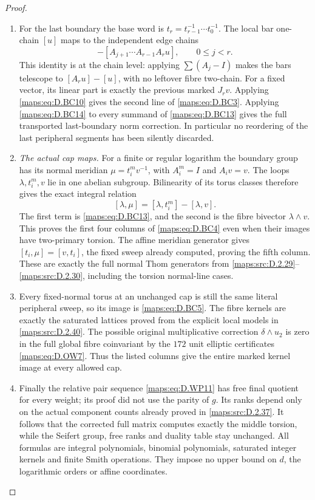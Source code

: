 \begin{proof}
\begin{enumerate}[label=\arabic*.,leftmargin=*]
\item For the last boundary the base word is
$t_r=t_{r-1}^{-1}\cdots t_0^{-1}$.
The local bar one-chain $[u]$ maps to the
independent edge chains
\[
         -[A_{j+1}\cdots A_{r-1}A_ru],
                            \qquad 0\le j<r .
                                                        \tag{D.BC14}\label{maps:eq:D.BC14}
\]
This identity is at the chain level: applying
$\sum(A_j-I)$ makes the bars telescope to
$[A_ru]-[u]$, with no leftover fibre two-chain.
For a fixed vector, its linear part is exactly
the previous marked $J_rv$. Applying
\eqref{maps:eq:D.BC10} gives the second line of \eqref{maps:eq:D.BC3}.
Applying \eqref{maps:eq:D.BC14} to every summand of
\eqref{maps:eq:D.BC13} gives the full transported last-boundary
norm correction. In particular no reordering
of the last peripheral segments has been
silently discarded.

\item \emph{The actual cap maps.}
For a finite or regular logarithm the boundary
group has its normal meridian
$\mu=t_i^m v^{-1}$, with $A_i^m=I$ and
$A_i v=v$. The loops $\lambda,t_i^m,v$ lie
in one abelian subgroup. Bilinearity of its
torus classes therefore gives the exact
integral relation
\[
              [\lambda,\mu]=[\lambda,t_i^m]-[\lambda,v].
                                                        \tag{D.BC15}\label{maps:eq:D.BC15}
\]
The first term is \eqref{maps:eq:D.BC13}, and the second is
the fibre bivector $\lambda\wedge v$.
This proves the first four columns of \eqref{maps:eq:D.BC4}
even when their images have two-primary
torsion. The affine meridian generator gives
$[t_i,\mu]=[v,t_i]$, the fixed sweep already
computed, proving the fifth column. These
are exactly the full normal Thom generators
from \ref{maps:src:D.2.29}--\ref{maps:src:D.2.30}, including the torsion
normal-line cases.

\item Every fixed-normal torus at an unchanged cap
is still the same literal peripheral sweep,
so its image is \eqref{maps:eq:D.BC5}. The fibre kernels
are exactly the saturated lattices proved
from the explicit local models in \ref{maps:src:D.2.40}.
The possible original multiplicative
correction $\delta\wedge u_2$ is zero in
the full global fibre coinvariant by the
$172$ unit elliptic certificates \eqref{maps:eq:D.OW7}.
Thus the listed columns give the entire
marked kernel image at every allowed cap.

\item Finally the relative pair sequence \eqref{maps:eq:D.WP11}
has free final quotient for every weight;
its proof did not use the parity of $g$.
Its ranks depend only on the actual component
counts already proved in \ref{maps:src:D.2.37}. It follows
that the corrected full matrix computes
exactly the middle torsion, while the Seifert
group, free ranks and duality table stay
unchanged. All formulas are integral
polynomials, binomial polynomials, saturated
integer kernels and finite Smith operations.
They impose no upper bound on $d$, the
logarithmic orders or affine coordinates.
\end{enumerate}
\end{proof}

